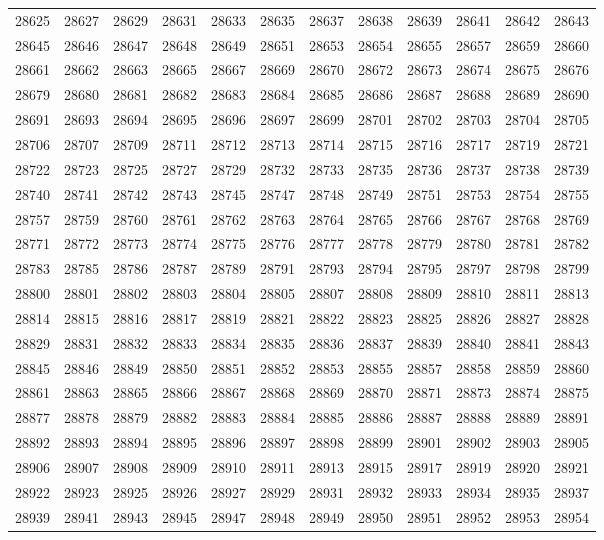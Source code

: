 \begin{center}
\begin{longtable}{llllllllllll}
28625 &28627 &28629 &28631 &28633 &28635 &28637 &28638 &28639 &28641 &28642 &28643 \\
28645 &28646 &28647 &28648 &28649 &28651 &28653 &28654 &28655 &28657 &28659 &28660 \\
28661 &28662 &28663 &28665 &28667 &28669 &28670 &28672 &28673 &28674 &28675 &28676 \\
28679 &28680 &28681 &28682 &28683 &28684 &28685 &28686 &28687 &28688 &28689 &28690 \\
28691 &28693 &28694 &28695 &28696 &28697 &28699 &28701 &28702 &28703 &28704 &28705 \\
28706 &28707 &28709 &28711 &28712 &28713 &28714 &28715 &28716 &28717 &28719 &28721 \\
28722 &28723 &28725 &28727 &28729 &28732 &28733 &28735 &28736 &28737 &28738 &28739 \\
28740 &28741 &28742 &28743 &28745 &28747 &28748 &28749 &28751 &28753 &28754 &28755 \\
28757 &28759 &28760 &28761 &28762 &28763 &28764 &28765 &28766 &28767 &28768 &28769 \\
28771 &28772 &28773 &28774 &28775 &28776 &28777 &28778 &28779 &28780 &28781 &28782 \\
28783 &28785 &28786 &28787 &28789 &28791 &28793 &28794 &28795 &28797 &28798 &28799 \\
28800 &28801 &28802 &28803 &28804 &28805 &28807 &28808 &28809 &28810 &28811 &28813 \\
28814 &28815 &28816 &28817 &28819 &28821 &28822 &28823 &28825 &28826 &28827 &28828 \\
28829 &28831 &28832 &28833 &28834 &28835 &28836 &28837 &28839 &28840 &28841 &28843 \\
28845 &28846 &28849 &28850 &28851 &28852 &28853 &28855 &28857 &28858 &28859 &28860 \\
28861 &28863 &28865 &28866 &28867 &28868 &28869 &28870 &28871 &28873 &28874 &28875 \\
28877 &28878 &28879 &28882 &28883 &28884 &28885 &28886 &28887 &28888 &28889 &28891 \\
28892 &28893 &28894 &28895 &28896 &28897 &28898 &28899 &28901 &28902 &28903 &28905 \\
28906 &28907 &28908 &28909 &28910 &28911 &28913 &28915 &28917 &28919 &28920 &28921 \\
28922 &28923 &28925 &28926 &28927 &28929 &28931 &28932 &28933 &28934 &28935 &28937 \\
28939 &28941 &28943 &28945 &28947 &28948 &28949 &28950 &28951 &28952 &28953 &28954 \\

\end{longtable}
\end{center}
